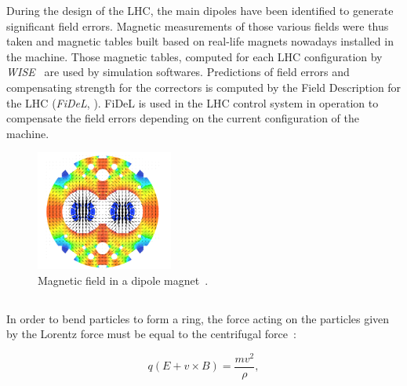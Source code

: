 During the design of the LHC, the main dipoles have been identified to generate significant field
errors. Magnetic measurements of those various fields were thus taken and magnetic tables built
based on real-life magnets nowadays installed in the machine. Those magnetic tables, computed for
each LHC configuration by \textit{WISE}~\cite{p_hagen_wise_2006} are used by simulation softwares.
Predictions of field errors and compensating strength for the correctors is computed by the Field
Description for the LHC (\textit{FiDeL}, \cite{noauthor_fidel_2021}). FiDeL is used in the LHC
control system in operation to compensate the field errors depending on the current configuration of
the machine.

\begin{figure}[!htb]
    \centering
    \includegraphics[width=0.4\textwidth]{./images/main_dipole_fields.png}
    \caption{Magnetic field in a dipole magnet~\cite{deniau_magnetic_2009}.}
    \label{fig:decapoles:magnetic_field_dipole}
\end{figure}

\FloatBarrier


\subsection{}

\subsubsection{}

In order to bend particles to form a ring, the force acting on the particles given by the Lorentz
force must be equal to the centrifugal force~\cite{holzer_design_2020,wiedemann_particle_2015}:

\begin{equation}
    q(E + v \times B) = \frac{mv^2}{\rho},
\end{equation}

